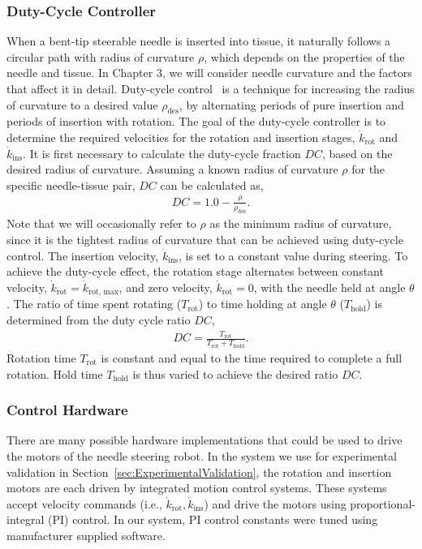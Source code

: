 \subsubsection{Duty-Cycle Controller}
When a bent-tip steerable needle is inserted into tissue, it naturally follows a circular path with radius of curvature $\rho$, which depends on the properties of the needle and tissue. In Chapter 3, we will consider needle curvature and the factors that affect it in detail. Duty-cycle control~\cite{Minhas2007} is a technique for increasing the radius of curvature to a desired value $\rho_{\text{des}}$, by alternating periods of pure insertion and periods of insertion with rotation. The goal of the duty-cycle controller is to determine the required velocities for the rotation and insertion stages, $\dot{k}_\text{rot}$ and $\dot{k}_\text{ins}$. It is first necessary to calculate the duty-cycle fraction $DC$, based on the desired radius of curvature. Assuming a known radius of curvature $\rho$ for the specific needle-tissue pair, $DC$ can be calculated as,
\begin{align}
DC = 1.0 - \frac{\rho}{\rho_{\text{des}}}. 
\label{eq:DC}
\end{align}
Note that we will occasionally refer to $\rho$ as the minimum radius of curvature, since it is the tightest radius of curvature that can be achieved using duty-cycle control. The insertion velocity, $\dot{k}_\text{ins}$, is set to a constant value during steering.  To achieve the duty-cycle effect, the rotation stage alternates between constant velocity, $\dot{k}_\text{rot} = \dot{k}_\text{rot, max}$, and zero velocity, $\dot{k}_\text{rot} = 0$, with the needle held at angle $\theta$. The ratio of time spent rotating ($T_\text{rot}$) to time holding at angle $\theta$ ($T_\text{hold}$) is determined from the duty cycle ratio $DC$,
\begin{align}
DC =\frac{T_\text{rot}}{T_\text{rot}+T_\text{hold}}.
\end{align}
Rotation time $T_\text{rot}$ is constant and equal to the time required to complete a full rotation. Hold time $T_\text{hold}$ is thus varied to achieve the desired ratio $DC$.

\subsubsection{Control Hardware}
There are many possible hardware implementations that could be used to drive the motors of the needle steering robot. In the system we use for experimental validation in Section~\ref{sec:ExperimentalValidation}, the rotation and insertion motors are each driven by integrated motion control systems. These systems accept velocity commands (i.e., $\dot{k}_\text{rot}, \dot{k}_\text{ins}$) and drive the motors using proportional-integral (PI) control. In our system, PI control constants were tuned using manufacturer supplied software.

